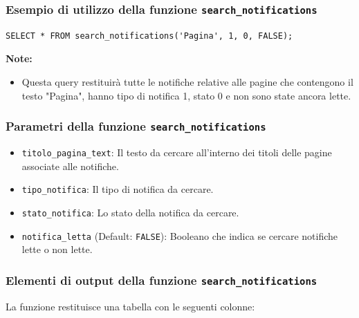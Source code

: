 \documentclass{article}
\begin{document}
    \newpage
    
    \subsubsection{Esempio di utilizzo della funzione \texttt{search\_notifications}}
    
    \begin{lstlisting}[style=SQL]
SELECT * FROM search_notifications('Pagina', 1, 0, FALSE);
    \end{lstlisting}
    \textbf{Note:} 
    \begin{itemize}
    	\item Questa query restituirà tutte le notifiche relative alle pagine che contengono il testo "Pagina", hanno tipo di notifica 1, stato 0 e non sono state ancora lette.
    	\\
    \end{itemize}
    
    \subsubsection{Parametri della funzione \texttt{search\_notifications}}	
    
    \begin{itemize}
    	\item \texttt{titolo\_pagina\_text}: Il testo da cercare all'interno dei titoli delle pagine associate alle notifiche.
    	\item \texttt{tipo\_notifica}: Il tipo di notifica da cercare.
    	\item \texttt{stato\_notifica}: Lo stato della notifica da cercare.
    	\item \texttt{notifica\_letta} (Default: \texttt{FALSE}): Booleano che indica se cercare notifiche lette o non lette.
    	\\
    \end{itemize}
    

    
    
\subsubsection{Elementi di output della funzione \texttt{search\_notifications}}
    
    La funzione restituisce una tabella con le seguenti colonne:
    
\end{document}
